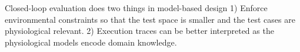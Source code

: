 Closed-loop evaluation does two things in model-based design 1) Enforce environmental constraints so that the test space is smaller and the test cases are physiological relevant. 2) Execution traces can be better interpreted as the physiological models encode domain knowledge. 

